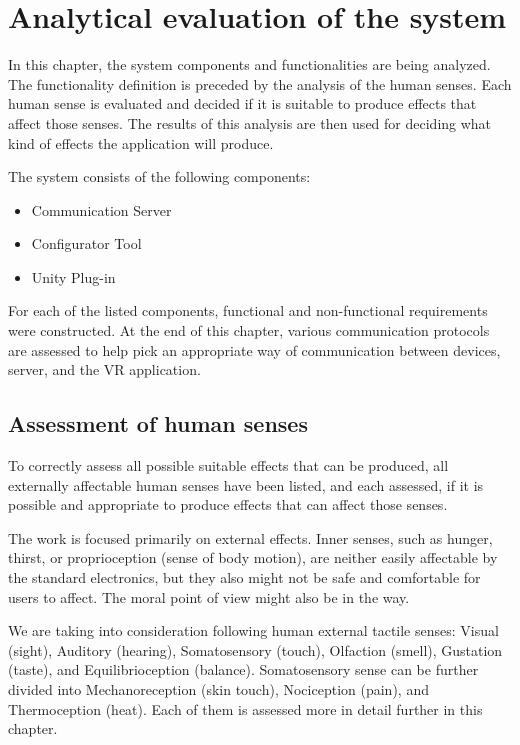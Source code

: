 \chapter{Analytical evaluation of the system}

In this chapter, the system components and functionalities are being analyzed.
The functionality definition is preceded by the analysis of the human senses.
Each human sense is evaluated and decided if it is suitable to produce effects
that affect those senses. The results of this analysis are then used for
deciding what kind of effects the application will produce.


The system consists of the following components:


\begin{itemize}

\item Communication Server

\item Configurator Tool

\item Unity Plug-in

\end{itemize}


For each of the listed components, functional and non-functional requirements
were constructed. At the end of this chapter, various communication protocols
are assessed to help pick an appropriate way of communication between devices,
server, and the VR application.


\hypertarget{x-assessment-of-human-senses}{\section{Assessment of human senses}}
To correctly assess all possible suitable effects that can be produced, all 
externally affectable human senses have been listed, and each assessed,
if it is possible and appropriate to produce effects that can affect those senses.


The work is focused primarily on external effects. Inner senses, such as
hunger, thirst, or proprioception (sense of body motion), are neither
easily affectable by the standard electronics, but they also might not be safe
and comfortable for users to affect. The moral point of view
might also be in the way.


We are taking into consideration following human external tactile senses:
Visual (sight), Auditory (hearing), Somatosensory (touch), Olfaction (smell),
Gustation (taste), and Equilibrioception (balance). Somatosensory sense can
be further divided into Mechanoreception (skin touch), Nociception (pain), and
Thermoception (heat). Each of them is assessed more in detail further in this
chapter.


